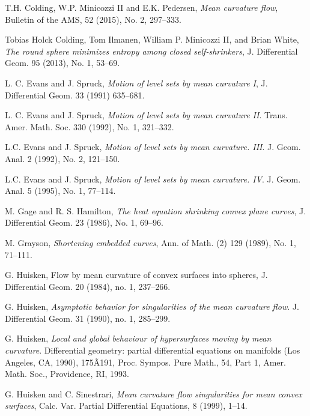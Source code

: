 \documentclass{amsart}
\theoremstyle{definition}
\begin{document}
\begin{thebibliography}{A}
 
T.H. Colding, W.P. Minicozzi II and E.K. Pedersen, {\emph{Mean curvature flow}}, Bulletin of the AMS, 52 (2015), No. 2, 297--333.


Tobias Holck Colding, Tom Ilmanen, William P. Minicozzi II, and Brian White, 
{\emph{The round sphere minimizes entropy among closed self-shrinkers}}, J. Differential Geom. 95 (2013), No. 1, 53--69. 
 
L. C. Evans and J. Spruck, \emph{Motion of level sets by mean curvature I}, J. Differential Geom.  33 (1991) 635--681.

L. C. Evans and J. Spruck, 
\emph{Motion of level sets by mean curvature II}. Trans. Amer. Math. Soc. 330 (1992), No. 1, 321--332. 

L.C. Evans and J. Spruck, 
\emph{Motion of level sets by mean curvature. III}. 
J. Geom. Anal. 2 (1992), No. 2, 121--150. 

L.C. Evans and J. Spruck, 
\emph{Motion of level sets by mean curvature. IV}. J. Geom. Anal. 5 (1995), No. 1, 77--114. 

M. Gage and R. S. Hamilton, \emph{The heat equation shrinking convex plane curves}, J. Differential Geom. 
23 (1986), No. 1, 69--96.

M. Grayson,  \emph{Shortening embedded curves},  Ann. of Math. (2) 129 (1989), No. 1, 71--111. 

G. Huisken, Flow by mean curvature of convex surfaces into spheres, J. Differential Geom. 20 (1984), no. 1, 237--266.  

G. Huisken, \emph{Asymptotic behavior for singularities of the mean curvature flow}. J. Differential
Geom. 31 (1990), no. 1, 285--299.

G. Huisken, \emph{Local and global behaviour of hypersurfaces moving by mean curvature}. Differential geometry:
partial differential equations on manifolds (Los Angeles, CA, 1990), 175Ã191, Proc. Sympos. Pure Math.,
54, Part 1, Amer. Math. Soc., Providence, RI, 1993.

G. Huisken and C. Sinestrari, 
\emph{Mean curvature flow singularities for mean convex surfaces}, 
Calc. Var. Partial Differential Equations, 8 (1999), 1--14.


\end{thebibliography}
\end{document}
